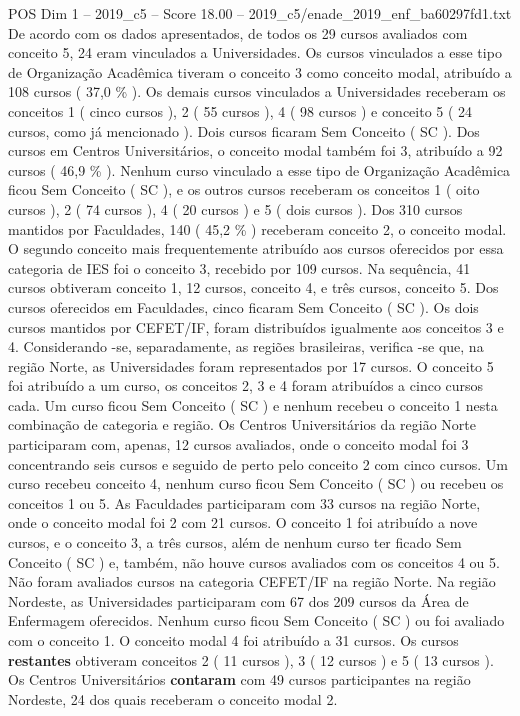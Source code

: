 \begin{textsample}{POS Dim 1 – 2019\_c5 – Score 18.00 – 2019\_c5/enade\_2019\_enf\_ba60297fd1.txt}
De acordo com os dados apresentados, de todos os 29 cursos avaliados com conceito 5, 24 eram vinculados a Universidades.
Os cursos vinculados a esse tipo de Organização Acadêmica tiveram o conceito 3 como conceito modal, atribuído a 108 cursos ( 37,0 \% ).
Os demais cursos vinculados a Universidades receberam os conceitos 1 ( cinco cursos ), 2 ( 55 cursos ), 4 ( 98 cursos ) e conceito 5 ( 24 cursos, como já mencionado ).
Dois cursos ficaram Sem Conceito ( SC ).
Dos cursos em Centros Universitários, o conceito modal também foi 3, atribuído a 92 cursos ( 46,9 \% ).
Nenhum curso vinculado a esse tipo de Organização Acadêmica ficou Sem Conceito ( SC ), e os outros cursos receberam os conceitos 1 ( oito cursos ), 2 ( 74 cursos ), 4 ( 20 cursos ) e 5 ( dois cursos ).
Dos 310 cursos mantidos por Faculdades, 140 ( 45,2 \% ) receberam conceito 2, o conceito modal.
O segundo conceito mais frequentemente atribuído aos cursos oferecidos por essa categoria de IES foi o conceito 3, recebido por 109 cursos.
Na sequência, 41 cursos obtiveram conceito 1, 12 cursos, conceito 4, e três cursos, conceito 5.
Dos cursos oferecidos em Faculdades, cinco ficaram Sem Conceito ( SC ).
Os dois cursos mantidos por CEFET/IF, foram distribuídos igualmente aos conceitos 3 e 4.
Considerando -se, separadamente, as regiões brasileiras, verifica -se que, na região Norte, as Universidades foram representados por 17 cursos.
O conceito 5 foi atribuído a um curso, os conceitos 2, 3 e 4 foram atribuídos a cinco cursos cada.
Um curso ficou Sem Conceito ( SC ) e nenhum recebeu o conceito 1 nesta combinação de categoria e região.
Os Centros Universitários da região Norte participaram com, apenas, 12 cursos avaliados, onde o conceito modal foi 3 concentrando seis cursos e seguido de perto pelo conceito 2 com cinco cursos.
Um curso recebeu conceito 4, nenhum curso ficou Sem Conceito ( SC ) ou recebeu os conceitos 1 ou 5.
As Faculdades participaram com 33 cursos na região Norte, onde o conceito modal foi 2 com 21 cursos.
O conceito 1 foi atribuído a nove cursos, e o conceito 3, a três cursos, além de nenhum curso ter ficado Sem Conceito ( SC ) e, também, não houve cursos avaliados com os conceitos 4 ou 5.
Não foram avaliados cursos na categoria CEFET/IF na região Norte.
Na região Nordeste, as Universidades participaram com 67 dos 209 cursos da Área de Enfermagem oferecidos.
Nenhum curso ficou Sem Conceito ( SC ) ou foi avaliado com o conceito 1.
O conceito modal 4 foi atribuído a 31 cursos.
Os cursos \textbf{restantes} obtiveram conceitos 2 ( 11 cursos ), 3 ( 12 cursos ) e 5 ( 13 cursos ).
Os Centros Universitários \textbf{contaram} com 49 cursos participantes na região Nordeste, 24 dos quais receberam o conceito modal 2.

\end{textsample}
